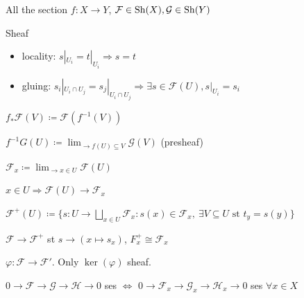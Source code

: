 All the section $f : X \to Y$, $\mathcal{F} \in \operatorname{Sh} (X), \mathcal{G} \in \operatorname{Sh} (Y)  $

\begin{definition} Sheaf
\begin{itemize}[topsep=-6pt, itemsep=0pt]
    \item locality: $s|_{U_i} = t|_{U_i} \Rightarrow s=t$
    \item gluing: $s_i|_{U_i \cap U_j} = s_j|_{U_i \cap U_j} \Rightarrow \exists s \in \mathcal{F}(U), s|_{U_i} = s_i$
\end{itemize}
\end{definition}

\begin{definition}
$f_* \mathcal{F}(V) \coloneqq \mathcal{F}(f ^{-1}(V))$
\end{definition}

\begin{definition}
$f^{-1} G(U) \coloneqq \lim_{ \to f(U) \subseteq V} \mathcal{G}(V) $ (presheaf)
\end{definition}

\begin{definition}[Stalk]
$\mathcal{F}_x \coloneqq \lim_{\to x \in U} \mathcal{F}(U)$
\end{definition}

\begin{proposition}
$x \in U \Rightarrow \mathcal{F}(U) \to \mathcal{F}_x$
\end{proposition}

\begin{definition}
$\mathcal{F}^+(U) \coloneqq \{ s: U \to \bigsqcup_{x \in U} \mathcal{F}_x : s(x) \in \mathcal{F}_x, \ \exists V \subseteq U \text{ st } t_y=s(y)\}$
\end{definition}

\begin{proposition}
$\mathcal{F} \to \mathcal{F}^+$ st $s \to (x \mapsto s_x)$, $F^+_x \cong \mathcal{F}_x$
\end{proposition}

\begin{proposition}
$\varphi : \mathcal{F} \to \mathcal{F}'$. Only $\ker (\varphi)$ sheaf.
\end{proposition}

\begin{proposition} $0 \to \mathcal{F} \to \mathcal{G} \to \mathcal{H} \to 0$ ses $ \Leftrightarrow $
$0 \to \mathcal{F}_x \to \mathcal{G}_x \to \mathcal{H}_x \to 0 $ ses $ \forall  x \in X$
\end{proposition}


